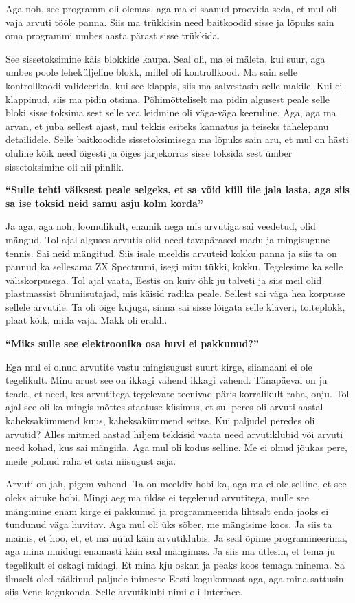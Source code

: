 Aga noh, see programm oli olemas, aga ma ei saanud proovida seda, et mul oli vaja arvuti tööle panna. Siis ma trükkisin need baitkoodid sisse ja  lõpuks sain oma programmi umbes aasta pärast sisse trükkida.

See sissetoksimine käis  blokkide kaupa. Seal oli, ma ei mäleta, kui suur, aga umbes poole leheküljeline blokk, millel oli kontrollkood. Ma sain selle kontrollkoodi valideerida, kui see klappis, siis ma salvestasin selle makile. Kui ei klappinud, siis ma pidin otsima. Põhimõtteliselt ma pidin algusest peale selle bloki sisse toksima sest selle vea leidmine oli väga-väga keeruline. Aga, aga ma arvan, et juba sellest ajast, mul tekkis esiteks kannatus ja teiseks tähelepanu detailidele. Selle baitkoodide sissetoksimisega ma lõpuks sain aru, et mul on hästi oluline kõik need õigesti ja õiges järjekorras sisse toksida sest ümber sissetoksimine oli nii piinlik.


\textbf{\enquote{Sulle tehti väiksest peale selgeks, et sa võid küll üle jala lasta, aga siis sa ise toksid neid samu asju kolm korda}}

Ja aga, aga noh, loomulikult, enamik aega mis arvutiga sai veedetud, olid  mängud. Tol ajal alguses arvutis olid need tavapärased madu ja  mingisugune tennis. Sai neid mängitud. Siis isale meeldis arvuteid kokku panna ja siis ta on pannud ka sellesama ZX Spectrumi, isegi mitu tükki, kokku. Tegelesime ka selle väliskorpusega. Tol ajal vaata, Eestis on kuiv õhk ju talveti ja siis meil olid plastmassist õhuniisutajad, mis käisid radika peale. Sellest sai väga hea korpusse sellele arvutile. Ta oli õige kujuga, sinna sai sisse lõigata selle klaveri, toiteplokk, plaat kõik, mida vaja. Makk oli eraldi.


\textbf{\enquote{Miks sulle see elektroonika osa huvi ei pakkunud?}}

Ega mul ei olnud arvutite vastu mingisugust suurt kirge, siiamaani ei ole tegelikult. Minu arust see on ikkagi vahend ikkagi vahend. Tänapäeval on ju teada, et need, kes arvutitega tegelevate teenivad päris korralikult raha, onju. Tol ajal see oli ka mingis mõttes staatuse küsimus, et sul peres oli arvuti aastal kaheksakümmend kuus, kaheksakümmend seitse. Kui paljudel peredes oli arvutid?  Alles mitmed aastad hiljem tekkisid vaata need arvutiklubid või arvuti need kohad, kus sai mängida. Aga mul oli kodus selline. Me ei olnud jõukas pere, meile polnud raha et osta niisugust asja. 

Arvuti on jah, pigem vahend. Ta  on meeldiv hobi ka, aga ma ei ole selline, et see oleks ainuke hobi. Mingi aeg ma üldse ei tegelenud arvutitega, mulle see mängimine enam kirge ei pakkunud ja programmeerida lihtsalt enda jaoks ei tundunud väga huvitav. Aga mul oli üks sõber, me mängisime koos. Ja siis ta mainis, et hoo, et, et ma nüüd käin arvutiklubis. Ja seal õpime programmeerima, aga mina muidugi enamasti käin seal mängimas. Ja siis ma ütlesin, et tema ju tegelikult ei oskagi midagi. Et mina kju oskan ja peaks koos temaga minema. Sa ilmselt oled rääkinud paljude inimeste Eesti kogukonnast aga, aga mina sattusin siis Vene kogukonda. Selle arvutiklubi nimi oli Interface.


